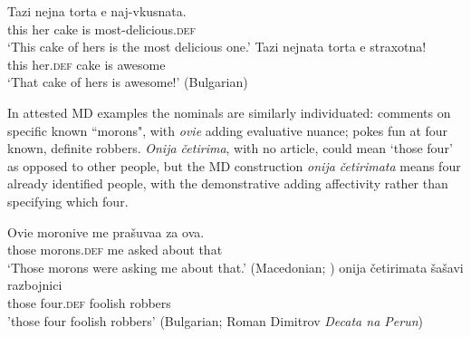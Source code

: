 \documentclass[output=paper,
colorlinks,
citecolor=brown,
newtxmath
]{langscibook}
\begin{document}
\ea
\ea \label{torta}
\gll Tazi nejna torta e 	naj-vkusnata.\\
this 	 her    cake is 	most-delicious.\textsc{def} \\
\glt‘This cake of hers is the most delicious one.’
\ex \label{tortata}
\gll Tazi nejnata torta e 	straxotna!\\
this   her.\textsc{def}  cake is 	awesome\\
\glt‘That cake of hers is awesome!’ \hfill(Bulgarian)
\z\z

\noindent In attested MD examples the nominals are similarly individuated:  comments on specific known ``morons", with \textit{ovie} adding evaluative nuance;  pokes fun at four known, definite robbers. \textit{Onija četirima}, with no article, could mean `those four' as opposed to other people, but the MD construction \textit{onija četirimata} means four already identified people, with the demonstrative adding affectivity rather than specifying which four.

\ea \label{morons}
\gll Ovie 	moronive me	prašuvaa za	ova.\\
	those 	morons.\textsc{def}	me	asked	about 	that \\
\glt‘Those morons were asking me about that.’ \hfill(Macedonian; \citealt{Prizma2015})
\z
\ea \label{four}
\gll onija 	četirimata šašavi razbojnici\\
those 	four.\textsc{def}	foolish robbers \\
\glt'those four foolish robbers' \hfill(Bulgarian; Roman Dimitrov \textit{Decata na Perun})
\z
\end{document}
